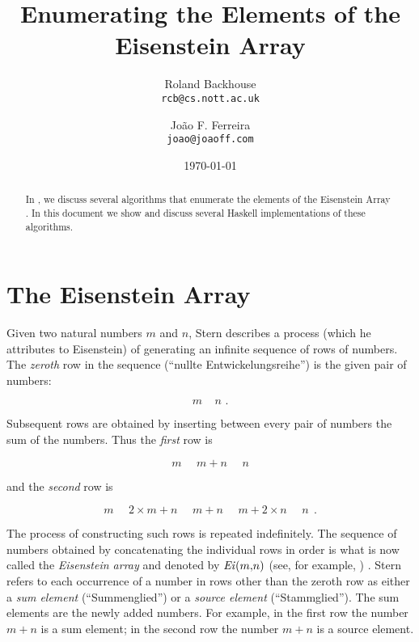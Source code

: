\documentclass{article}[12pt]
\title{Enumerating the Elements of the Eisenstein Array}
\author{
   Roland Backhouse \\{\tt\small rcb@cs.nott.ac.uk} 
   \and 
   Jo\~ao F. Ferreira \\{\tt\small joao@joaoff.com}
}
\date{\today}
\begin{document}
\maketitle

\begin{abstract}
In \cite{jff*09:euclid-alg}, we discuss several algorithms that enumerate the elements of the Eisenstein 
Array \cite{stern1858:rationals}. In this document we show and discuss several Haskell implementations of these algorithms.
\end{abstract}


\section{The Eisenstein Array}
Given two natural numbers $m$ and $n$, Stern \cite{stern1858:rationals} describes a process 
(which he attributes to Eisenstein) of generating an infinite  sequence of rows of numbers.  
The \emph{zeroth}  row in the sequence (``nullte Entwickelungsreihe'') is the given pair of numbers:

\begin{displaymath}
m\ \ \ \ \ n\mbox{\ \ \ .}
\end{displaymath}

Subsequent rows are obtained by inserting between every pair of numbers the sum of the numbers.  Thus
the \emph{first} row is

\begin{displaymath}
m\ \ \ \ \ \ m{+}n\ \ \ \ \ \ n 
\end{displaymath}

and the \emph{second} row is

\begin{displaymath}
m\ \ \ \ \ \ 2{\times}m + n\ \ \ \ \ \ m{+}n\ \ \ \ \ \ m + 2{\times}n\ \ \ \ \ \ n~~. 
\end{displaymath}

The process of constructing such rows is repeated indefinitely.  The sequence of numbers obtained by
concatenating the individual rows in order is what is now called the \emph{Eisenstein array} and denoted by
 $\mathit{Ei\/}(m{,}n)$ (see, for example, \cite[sequence A064881]{sloane-integers}) .  
Stern refers to each occurrence of a number  in rows other than the
zeroth row as either  a 
\emph{sum element} (``Summenglied'')  or a  \emph{source element} (``Stammglied'').    The sum elements are the
newly added numbers.  For example, in the first row the
number $m{+}n$ is a sum element; in the second row the number $m{+}n$ is a  source element. 
\end{document}
